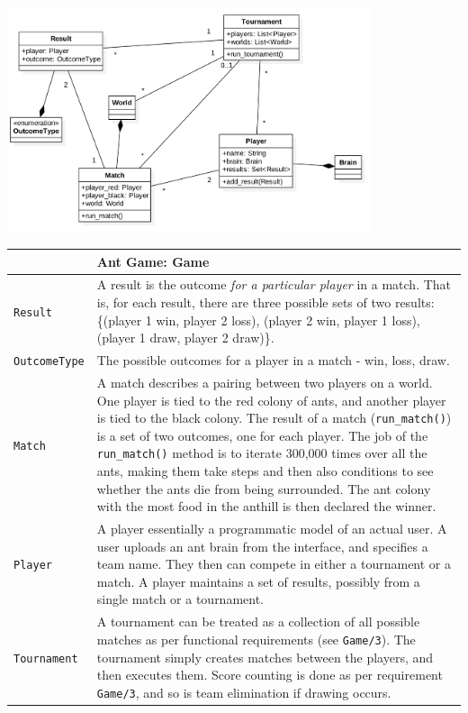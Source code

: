 \documentclass[11pt]{article}
\begin{document}
\begin{center}
\includegraphics[width=0.8\textwidth]{low-level-diagrams/class/game.png}
\end{center}

\begin{longtable}[c]{@{}p{}p{}@{}}
\toprule
& Ant Game: Game \tabularnewline
\midrule
\texttt{Result} & A result is the outcome \textit{for a particular player} in a match. That is, for each result, there are three possible sets of two results: \{(player 1 win, player 2 loss), (player 2 win, player 1 loss), (player 1 draw, player 2 draw)\}. \tabularnewline
\texttt{OutcomeType} & The possible outcomes for a player in a match - win, loss, draw. \tabularnewline
\texttt{Match} & A match describes a pairing between two players on a world. One player is tied to the red colony of ants, and another player is tied to the black colony. The result of a match (\texttt{run\_match()}) is a set of two outcomes, one for each player. The job of the \texttt{run\_match()} method is to iterate 300,000 times over all the ants, making them take steps and then also conditions to see whether the ants die from being surrounded. The ant colony with the most food in the anthill is then declared the winner. \tabularnewline
\texttt{Player} & A player essentially a programmatic model of an actual user. A user uploads an ant brain from the interface, and specifies a team name. They then can compete in either a tournament or a match. A player maintains a set of results, possibly from a single match or a tournament. \tabularnewline
\texttt{Tournament} & A tournament can be treated as a collection of all possible matches as per functional requirements (see \texttt{Game/3}). The tournament simply creates matches between the players, and then executes them. Score counting is done as per requirement \texttt{Game/3}, and so is team elimination if drawing occurs. \tabularnewline
\bottomrule
\end{longtable}
\end{document}
